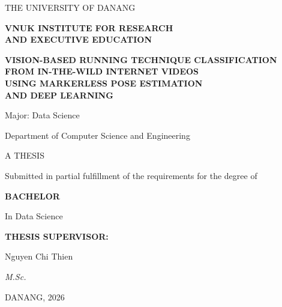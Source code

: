 \begin{titlepage}
\centering
\singlespacing

{\large\MakeUppercase{The University of Danang}\par}
\vspace{0.15cm}

{\large\bfseries
\MakeUppercase{
VNUK Institute for Research\\
and Executive Education
}\par}

\vspace{2cm}

{\Large\bfseries
\MakeUppercase{
Vision-Based Running Technique Classification\\
from In-the-Wild Internet Videos\\
using Markerless Pose Estimation\\
and Deep Learning
}\par}

\vspace{0.8cm}

{\large
Major: Data Science
\par}

\vspace{0.2cm}

{\large
Department of Computer Science and Engineering
\par}

\vfill

{\large
A THESIS
\par}

\vspace{0.15cm}

Submitted in partial fulfillment of the requirements for the degree of

\vspace{0.2cm}

{\large\bfseries
BACHELOR
\par}

\vspace{0.2cm}

In Data Science

\vspace{1.8cm}

\begin{flushleft}

\textbf{THESIS SUPERVISOR:}

\vspace{0.35cm}

Nguyen Chi Thien

\vspace{0.15cm}

\textit{M.Sc.}

\end{flushleft}

\vfill

{\large
DANANG, 2026
\par}

\end{titlepage}